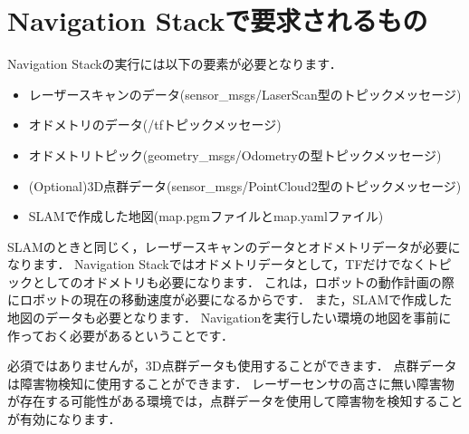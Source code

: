 \documentclass[{../../master}]{subfiles}
\begin{document}
\section{Navigation Stackで要求されるもの}

Navigation Stackの実行には以下の要素が必要となります．

\begin{itemize}
  \item レーザースキャンのデータ(\textsf{sensor\_msgs/LaserScan}型のトピックメッセージ)
  \item オドメトリのデータ(\textsf{/tf}トピックメッセージ)
  \item オドメトリトピック(\textsf{geometry\_msgs/Odometry}の型トピックメッセージ)
  \item (Optional)3D点群データ(\textsf{sensor\_msgs/PointCloud2}型のトピックメッセージ)
  \item SLAMで作成した地図(\textsf{map.pgm}ファイルと\textsf{map.yaml}ファイル)
\end{itemize}

SLAMのときと同じく，レーザースキャンのデータとオドメトリデータが必要になります．
Navigation Stackではオドメトリデータとして，TFだけでなくトピックとしてのオドメトリも必要になります．
これは，ロボットの動作計画の際にロボットの現在の移動速度が必要になるからです．
また，SLAMで作成した地図のデータも必要となります．
Navigationを実行したい環境の地図を事前に作っておく必要があるということです．

必須ではありませんが，3D点群データも使用することができます．
点群データは障害物検知に使用することができます．
レーザーセンサの高さに無い障害物が存在する可能性がある環境では，点群データを使用して障害物を検知することが有効になります．
\end{document}
